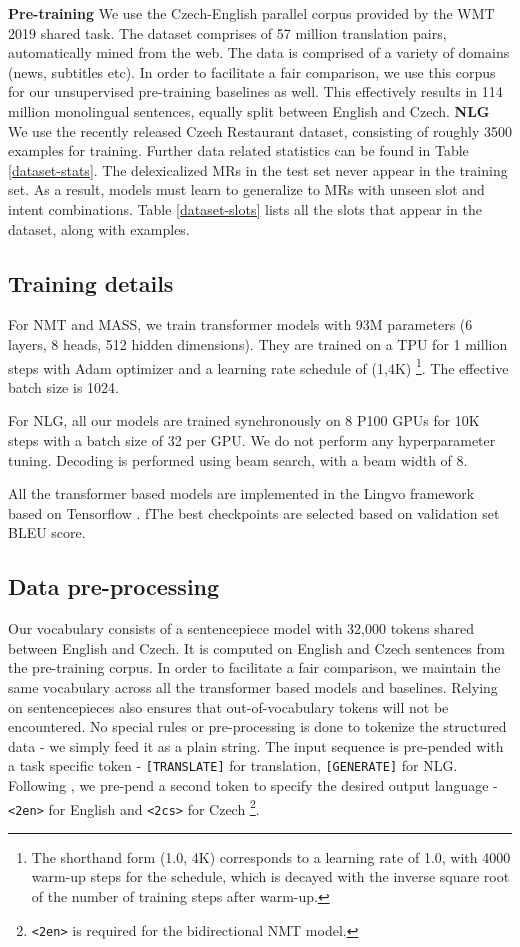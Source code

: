 \documentclass[11pt,a4paper]{article}
\begin{document}
\textbf{Pre-training} We use the Czech-English parallel corpus provided by the WMT 2019 shared task. The dataset comprises of 57 million translation pairs, automatically mined from the web. The data is comprised of a variety of domains (news, subtitles etc). In order to facilitate a fair comparison, we use this corpus for our unsupervised pre-training baselines as well. This effectively results in 114 million monolingual sentences, equally split between English and Czech. \newline
\textbf{NLG} We use the recently released Czech Restaurant dataset, consisting of roughly 3500 examples for training. Further data related statistics can be found in Table \ref{dataset-stats}. The delexicalized MRs in the test set never appear in the training set. As a result, models must learn to generalize to MRs with unseen slot and intent combinations. Table \ref{dataset-slots} lists all the slots that appear in the dataset, along with examples.

\subsection{Training details}
For NMT and MASS, we train transformer models with 93M parameters (6 layers, 8 heads, 512 hidden dimensions). They are trained on a TPU for 1 million steps with Adam optimizer and a learning rate schedule of (1,4K) \footnote{The shorthand form (1.0, 4K) corresponds to a learning rate of 1.0, with 4000 warm-up steps for the schedule, which is decayed with the inverse square root of the number of training steps after warm-up.}. The effective batch size is 1024. \par
For NLG, all our models are trained synchronously on 8 P100 GPUs for 10K steps with a batch size of 32 per GPU. 
We do not perform any hyperparameter tuning. Decoding is performed using beam search, with a beam width of 8. \par
All the transformer based models are implemented in the Lingvo framework \citep{shen2019lingvo} based on Tensorflow \citep{abadi2016tensorflow}. fThe best checkpoints are selected based on validation set BLEU score.  

\subsection{Data pre-processing}
Our vocabulary consists of a  sentencepiece model with 32,000 tokens \citep{kudo2018sentencepiece} shared between English and Czech. It is computed on  English and Czech sentences from the pre-training corpus. In order to facilitate a fair comparison, we maintain the same vocabulary across all the transformer based models and baselines. Relying on sentencepieces also ensures that out-of-vocabulary tokens will not be encountered. No special rules or pre-processing is done to tokenize the structured data - we simply feed it as a plain string. 
The input sequence is pre-pended with a task specific token -  \texttt{[TRANSLATE]} for translation, \texttt{[GENERATE]} for NLG. Following \citet{aharoni2019massively}, we pre-pend a second token to specify the desired output language - \texttt{<2en>} for English and \texttt{<2cs>} for Czech \footnote{\texttt{<2en>} is required for the bidirectional NMT model.}.
\end{document}
